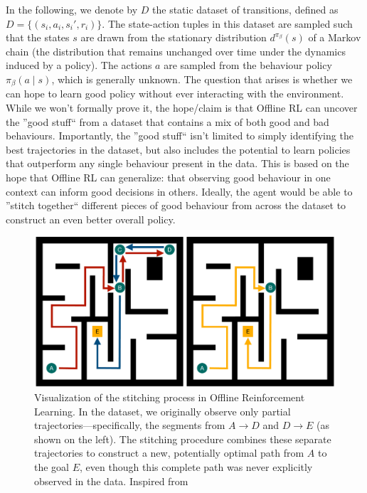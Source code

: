 In the following, we denote by $D$ the static dataset of transitions, defined as $D = \{(s_i, a_i, s_i', r_i)\}.$
The state-action tuples in this dataset are sampled such that the states $s$ are drawn from the stationary distribution 
$d^{\pi_\beta}(s)$ of a Markov chain (the distribution that remains unchanged over time under the dynamics induced by a 
policy). The actions $a$ are sampled from the behaviour policy $\pi_\beta(a \mid s)$, which is generally unknown.\newline
The question that arises is whether we can hope to learn good policy without ever 
interacting with the environment. While we won’t formally prove it, the hope/claim is that
Offline RL can uncover the ''good stuff`` from a dataset that contains a mix of both good 
and bad behaviours. Importantly, the ''good stuff`` isn't limited to simply identifying the 
best trajectories in the dataset, but also includes the potential to learn policies that outperform
any single behaviour present in the data. This is based on the hope that Offline RL can generalize: 
that observing good behaviour in one context can inform good decisions in others. Ideally, the agent 
would be able to ''stitch together`` different pieces of good behaviour from across the dataset to construct 
an even better overall policy.
\begin{figure} [H]
    \centering
    \includegraphics[width=0.6\linewidth]{images/maze_stitching.pdf}
    \caption{Visualization of the stitching process in Offline Reinforcement Learning. In the dataset, 
    we originally observe only partial trajectories—specifically, the segments from $ A \rightarrow D $
    and $ D \rightarrow E $ (as shown on the left). The stitching procedure combines these separate 
    trajectories to construct a new, potentially optimal path from $ A $ to the goal $ E $, 
    even though this complete path was never explicitly observed in the data. Inspired from 
    \cite{OfflineRL_Or_Imitation}}
    \label{offline_stitching}
\end{figure}
